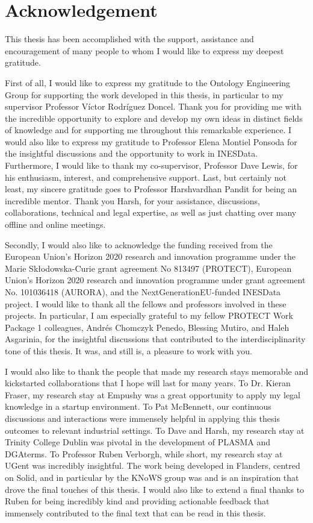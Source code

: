 %
\section*{Acknowledgement}
\label{sec::acknowledgement}

This thesis has been accomplished with the support, assistance and encouragement of many people to whom I would like to express my deepest gratitude.

First of all, I would like to express my gratitude to the Ontology Engineering Group for supporting the work developed in this thesis, in particular to my supervisor Professor Víctor Rodríguez Doncel.
Thank you for providing me with the incredible opportunity to explore and develop my own ideas in distinct fields of knowledge and for supporting me throughout this remarkable experience.
I would also like to express my gratitude to Professor Elena Montiel Ponsoda for the insightful discussions and the opportunity to work in INESData.
Furthermore, I would like to thank my co-supervisor, Professor Dave Lewis, for his enthusiasm, interest, and comprehensive support.
Last, but certainly not least, my sincere gratitude goes to Professor Harshvardhan Pandit for being an incredible mentor.
Thank you Harsh, for your assistance, discussions, collaborations, technical and legal expertise, as well as just chatting over many offline and online meetings.

Secondly, I would also like to acknowledge the funding received from the European Union's Horizon 2020 research and innovation programme under the Marie Skłodowska-Curie grant agreement No 813497 (PROTECT), European Union’s Horizon 2020 research and innovation programme under grant agreement No. 101036418 (AURORA), and the NextGenerationEU-funded INESData project.
I would like to thank all the fellows and professors involved in these projects.
In particular, I am especially grateful to my fellow PROTECT Work Package 1 colleagues, Andrés Chomczyk Penedo, Blessing Mutiro, and Haleh Asgarinia, for the insightful discussions that contributed to the interdisciplinarity tone of this thesis.
It was, and still is, a pleasure to work with you.

I would also like to thank the people that made my research stays memorable and kickstarted collaborations that I hope will last for many years.
To Dr. Kieran Fraser, my research stay at Empushy was a great opportunity to apply my legal knowledge in a startup environment.
To Pat McBennett, our continuous discussions and interactions were immensely helpful in applying this thesis outcomes to relevant industrial settings.
To Dave and Harsh, my research stay at Trinity College Dublin was pivotal in the development of PLASMA and DGAterms.
To Professor Ruben Verborgh, while short, my research stay at UGent was incredibly insightful.
The work being developed in Flanders, centred on Solid, and in particular by the KNoWS group was and is an inspiration that drove the final touches of this thesis.
I would also like to extend a final thanks to Ruben for being incredibly kind and providing actionable feedback that immensely contributed to the final text that can be read in this thesis.

